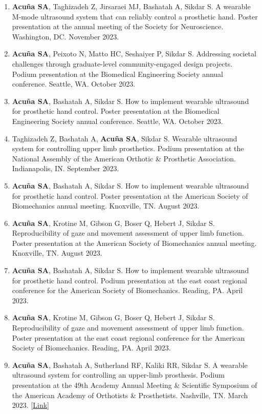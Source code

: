\documentclass[letterpaper, 10pt]{article}
\begin{document}
\begin{enumerate}
    \item \textbf{Acuña SA}, Taghizadeh Z, Jirsaraei MJ, Bashatah A, Sikdar S. A wearable M-mode ultrasound system that can reliably control a prosthetic hand. Poster presentation at the annual meeting of the Society for Neuroscience. Washington, DC. November 2023.
    \item \textbf{Acuña SA}, Peixoto N, Matto HC, Seshaiyer P, Sikdar S. Addressing societal challenges through graduate-level community-engaged design projects. Podium presentation at the Biomedical Engineering Society annual conference. Seattle, WA. October 2023.
    \item \textbf{Acuña SA}, Bashatah A, Sikdar S. How to implement wearable ultrasound for prosthetic hand control. Poster presentation at the Biomedical Engineering Society annual conference. Seattle, WA. October 2023.
    \item Taghizadeh Z, Bashatah A, \textbf{Acuña SA}, Sikdar S. Wearable ultrasound system for controlling upper limb prosthetics. Podium presentation at the National Assembly of the American Orthotic \& Prosthetic Association. Indianapolis, IN. September 2023.
    \item \textbf{Acuña SA}, Bashatah A, Sikdar S. How to implement wearable ultrasound for prosthetic hand control. Poster presentation at the American Society of Biomechanics annual meeting. Knoxville, TN. August 2023.
     \item \textbf{Acuña SA}, Krotine M, Gibson G, Boser Q, Hebert J, Sikdar S. Reproducibility of gaze and movement assessment of upper limb function. Poster presentation at the American Society of Biomechanics annual meeting. Knoxville, TN. August 2023.
    \item \textbf{Acuña SA}, Bashatah A, Sikdar S. How to implement wearable ultrasound for prosthetic hand control. Podium presentation at the east coast regional conference for the American Society of Biomechanics. Reading, PA. April 2023.
     \item \textbf{Acuña SA}, Krotine M, Gibson G, Boser Q, Hebert J, Sikdar S. Reproducibility of gaze and movement assessment of upper limb function. Poster presentation at the east coast regional conference for the American Society of Biomechanics. Reading, PA. April 2023.
    \item \textbf{Acuña SA}, Bashatah A, Sutherland RF, Kaliki RR, Sikdar S. A wearable ultrasound system for controlling an upper-limb prosthesis. Podium presentation at the 49th Academy Annual Meeting \& Scientiﬁc Symposium of the American Academy of Orthotists \& Prosthetists. Nashville, TN. March 2023. [\href{https://journals.lww.com/jpojournal/Citation/2023/04001/UPPER_LIMB_PROSTHESES.10.aspx}{Link}]

\end{enumerate}
\end{document}

